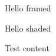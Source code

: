 \documentclass{article}
\begin{document}
\begin{framed}
Hello framed
\end{framed}
\begin{shaded}
Hello shaded
\end{shaded}
Test content
\end{document}
